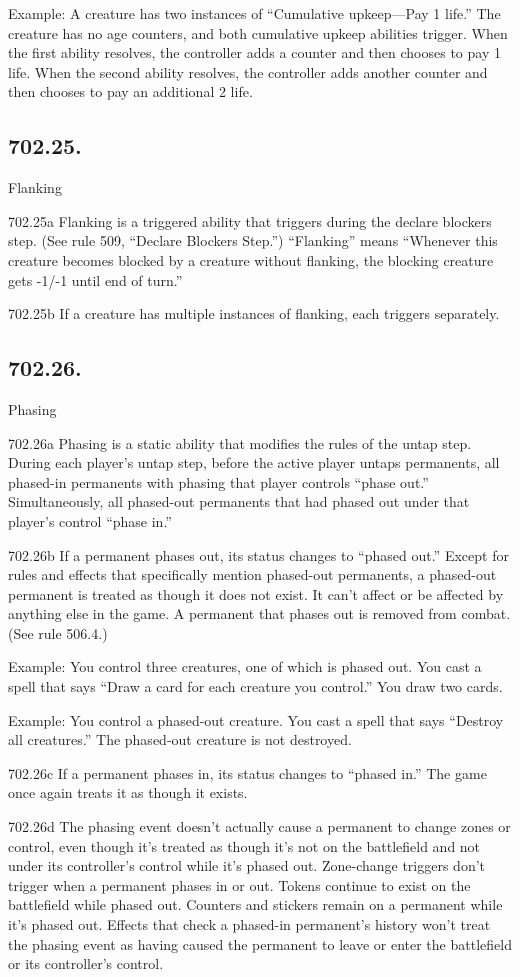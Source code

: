 Example: A creature has two instances of “Cumulative upkeep—Pay 1 life.” The creature has no age counters, and both cumulative upkeep abilities trigger. When the first ability resolves, the controller adds a counter and then chooses to pay 1 life. When the second ability resolves, the controller adds another counter and then chooses to pay an additional 2 life.

\subsection*{702.25.}
Flanking

702.25a Flanking is a triggered ability that triggers during the declare blockers step. (See rule 509, “Declare Blockers Step.”) “Flanking” means “Whenever this creature becomes blocked by a creature without flanking, the blocking creature gets -1/-1 until end of turn.”

702.25b If a creature has multiple instances of flanking, each triggers separately.

\subsection*{702.26.}
Phasing

702.26a Phasing is a static ability that modifies the rules of the untap step. During each player’s untap step, before the active player untaps permanents, all phased-in permanents with phasing that player controls “phase out.” Simultaneously, all phased-out permanents that had phased out under that player’s control “phase in.”

702.26b If a permanent phases out, its status changes to “phased out.” Except for rules and effects that specifically mention phased-out permanents, a phased-out permanent is treated as though it does not exist. It can’t affect or be affected by anything else in the game. A permanent that phases out is removed from combat. (See rule 506.4.)

Example: You control three creatures, one of which is phased out. You cast a spell that says “Draw a card for each creature you control.” You draw two cards.

Example: You control a phased-out creature. You cast a spell that says “Destroy all creatures.” The phased-out creature is not destroyed.

702.26c If a permanent phases in, its status changes to “phased in.” The game once again treats it as though it exists.

702.26d The phasing event doesn’t actually cause a permanent to change zones or control, even though it’s treated as though it’s not on the battlefield and not under its controller’s control while it’s phased out. Zone-change triggers don’t trigger when a permanent phases in or out. Tokens continue to exist on the battlefield while phased out. Counters and stickers remain on a permanent while it’s phased out. Effects that check a phased-in permanent’s history won’t treat the phasing event as having caused the permanent to leave or enter the battlefield or its controller’s control.

